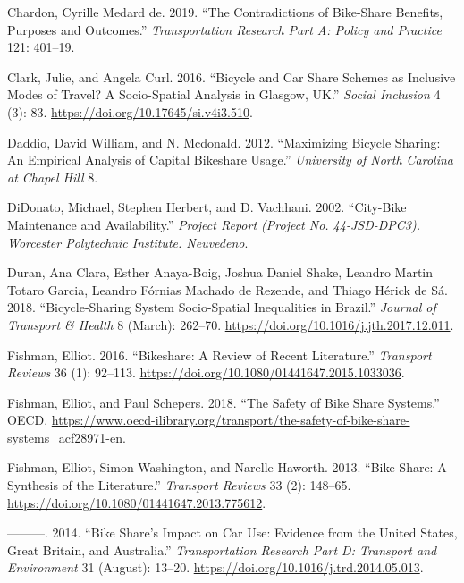 \documentclass[]{article}
\begin{document}
\leavevmode\hypertarget{ref-de_chardon_contradictions_2019}{}%
Chardon, Cyrille Medard de. 2019. ``The Contradictions of Bike-Share Benefits, Purposes and Outcomes.'' \emph{Transportation Research Part A: Policy and Practice} 121: 401--19.

\leavevmode\hypertarget{ref-clark_bicycle_2016}{}%
Clark, Julie, and Angela Curl. 2016. ``Bicycle and Car Share Schemes as Inclusive Modes of Travel? A Socio-Spatial Analysis in Glasgow, UK.'' \emph{Social Inclusion} 4 (3): 83. \url{https://doi.org/10.17645/si.v4i3.510}.

\leavevmode\hypertarget{ref-daddio_maximizing_2012}{}%
Daddio, David William, and N. Mcdonald. 2012. ``Maximizing Bicycle Sharing: An Empirical Analysis of Capital Bikeshare Usage.'' \emph{University of North Carolina at Chapel Hill} 8.

\leavevmode\hypertarget{ref-didonato_city-bike_2002}{}%
DiDonato, Michael, Stephen Herbert, and D. Vachhani. 2002. ``City-Bike Maintenance and Availability.'' \emph{Project Report (Project No. 44-JSD-DPC3). Worcester Polytechnic Institute. Neuvedeno}.

\leavevmode\hypertarget{ref-duran_bicycle-sharing_2018}{}%
Duran, Ana Clara, Esther Anaya-Boig, Joshua Daniel Shake, Leandro Martin Totaro Garcia, Leandro Fórnias Machado de Rezende, and Thiago Hérick de Sá. 2018. ``Bicycle-Sharing System Socio-Spatial Inequalities in Brazil.'' \emph{Journal of Transport \& Health} 8 (March): 262--70. \url{https://doi.org/10.1016/j.jth.2017.12.011}.

\leavevmode\hypertarget{ref-fishman_bikeshare:_2016}{}%
Fishman, Elliot. 2016. ``Bikeshare: A Review of Recent Literature.'' \emph{Transport Reviews} 36 (1): 92--113. \url{https://doi.org/10.1080/01441647.2015.1033036}.

\leavevmode\hypertarget{ref-fishman_safety_2018}{}%
Fishman, Elliot, and Paul Schepers. 2018. ``The Safety of Bike Share Systems.'' OECD. \url{https://www.oecd-ilibrary.org/transport/the-safety-of-bike-share-systems_acf28971-en}.

\leavevmode\hypertarget{ref-fishman_bike_2013}{}%
Fishman, Elliot, Simon Washington, and Narelle Haworth. 2013. ``Bike Share: A Synthesis of the Literature.'' \emph{Transport Reviews} 33 (2): 148--65. \url{https://doi.org/10.1080/01441647.2013.775612}.

\leavevmode\hypertarget{ref-fishman_bike_2014}{}%
---------. 2014. ``Bike Share's Impact on Car Use: Evidence from the United States, Great Britain, and Australia.'' \emph{Transportation Research Part D: Transport and Environment} 31 (August): 13--20. \url{https://doi.org/10.1016/j.trd.2014.05.013}.
\end{document}
